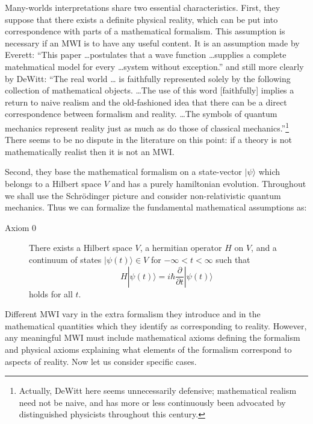\documentclass[aps,pra,12pt]{revtex4}
\def\ket#1{| #1\rangle}
\begin{document}
Many-worlds interpretations share two essential characteristics.
First, they suppose that there exists a definite physical reality,
which can be put into correspondence with parts of a mathematical
formalism.  This assumption is necessary if an MWI is to have any
useful content. It is an assumption made by Everett:\cite{ev} ``This paper
\ldots postulates that a wave function \ldots supplies a complete
matehmatical model for every \ldots system without exception.'' and
still more clearly by DeWitt:\cite{dew} ``The real world \ldots
is faithfully represented solely by the following collection of 
mathematical objects. \ldots The use of this word [faithfully] implies
a return to naive realism and the old-fashioned idea that there can be a 
direct correspondence between formalism and reality. \ldots The symbols
of quantum mechanics represent reality just as much as do those of 
classical mechanics.''\footnote{Actually, DeWitt here seems 
unnecessarily defensive; mathematical realism need not be naive, and has more 
or less continuously been advocated by distinguished physicists 
throughout this century.}
There seems to be no dispute in the literature on this point: if a theory
is not mathematically realist then it is not an MWI.

Second, they base the mathematical formalism on a state-vector
$\ket{\psi}$ which belongs to a Hilbert space $V$ and has a purely
hamiltonian evolution.  Throughout we shall use the Schr\"{o}dinger
picture and consider non-relativistic quantum mechanics.  Thus we can
formalize the fundamental mathematical assumptions as:
\begin{description}
\item[Axiom $0$]  There exists a Hilbert space $V$, a hermitian operator $H$ on
$V$, and a continuum of states $\ket{ \psi (t) } \in V$ for $-\infty <
t < \infty$ such that
\begin{equation}\label{schrod}
H \ket{ \psi (t) } = i \hbar \frac{ \partial }{\partial t} \ket{ \psi
(t) }~~
\end{equation}
holds for all $t$.
\end{description}

Different MWI vary in the extra formalism they introduce and in the
mathematical quantities which they identify as corresponding to
reality.  However, any meaningful MWI must include mathematical axioms
defining the formalism and physical axioms explaining what elements of
the formalism correspond to aspects of reality.  Now let us consider
specific cases.
\end{document}
